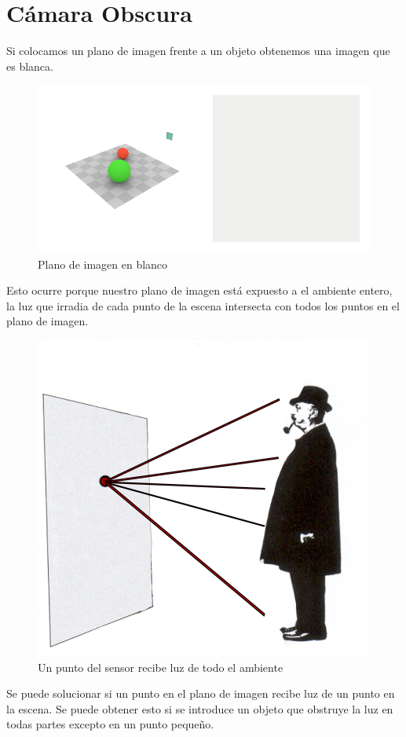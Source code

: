 \documentclass{article}
\begin{document}
	
	


	
\tableofcontents

\pagebreak
	
\section{Cámara Obscura}
Si colocamos un plano de imagen frente a un objeto obtenemos una imagen que es blanca.

\begin{figure}[H]
	\centering
	\includegraphics[width=0.65\linewidth]{Figuras/Image_Blanco}
	\caption{Plano de imagen en blanco}
	\label{fig:imageblanco}
\end{figure}

Esto ocurre porque nuestro plano de imagen está expuesto a el ambiente entero, la luz que irradia de cada punto de la escena intersecta con todos los puntos en el plano de imagen.

\begin{figure}[H]
	\centering
	\includegraphics[width=0.5\linewidth]{Figuras/Sensor_Blanco}
	\caption{Un punto del sensor recibe luz de todo el ambiente}
	\label{fig:sensorblanco}
\end{figure}

Se puede solucionar si un punto en el plano de imagen recibe luz de un punto en la escena. Se puede obtener esto si se introduce un objeto que obstruye la luz en todas partes excepto en un punto pequeño.
\end{document}
